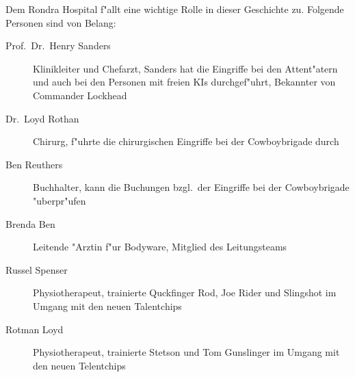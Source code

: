 
Dem Rondra Hospital f"allt eine wichtige Rolle in dieser Geschichte zu. Folgende Personen sind von Belang:

\begin{description}
    \item[Prof.~Dr.~Henry Sanders] Klinikleiter und Chefarzt, Sanders hat die Eingriffe bei den Attent"atern und auch 
        bei den Personen mit freien KIs durchgef"uhrt, Bekannter von Commander Lockhead
    \item[Dr.~Loyd Rothan] Chirurg, f"uhrte die chirurgischen Eingriffe bei der Cowboybrigade durch
    \item[Ben Reuthers] Buchhalter, kann die Buchungen bzgl.~der Eingriffe bei der Cowboybrigade "uberpr"ufen
    \item[Brenda Ben] Leitende "Arztin f"ur Bodyware, Mitglied des Leitungsteams
    \item[Russel Spenser] Physiotherapeut, trainierte Quckfinger Rod, Joe Rider und Slingshot im Umgang mit den neuen 
        Talentchips
    \item[Rotman Loyd] Physiotherapeut, trainierte Stetson und Tom Gunslinger im Umgang mit den neuen Telentchips
\end{description}

